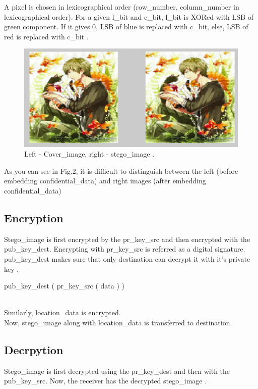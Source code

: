 \documentclass[conference]{IEEEtran}
\begin{document}
A pixel is chosen in lexicographical order (row\_number, column\_number in lexicographical order).
For a given l\_bit and c\_bit, l\_bit is XORed with LSB of green component.
If it gives 0, LSB of blue is replaced with c\_bit, else, LSB of red is replaced with c\_bit \cite{b2}.\\

\begin{figure}[H]
  \includegraphics[width=\linewidth]{cover_image_vs_stego_image.png}
  \caption{Left - Cover\_image, right - stego\_image \cite{b2}.}
\end{figure}

As you can see in Fig.2, it is difficult to distinguish between the left (before embedding confidential\_data) and right images (after embedding confidential\_data)

\subsection{Encryption}
Stego\_image is first encrypted by the pr\_key\_src and then encrypted with the pub\_key\_dest.
Encrypting with pr\_key\_src is referred as a digital signature.
pub\_key\_dest makes sure that only destination can decrypt it with it's private key \cite{b2}.\\

\centerline{ pub\_key\_dest ( pr\_key\_src ( data ) ) }
\leavevmode \\
Similarly, location\_data is encrypted.\\

Now, stego\_image along with location\_data is transferred to destination.

\subsection{Decrpytion}
Stego\_image is first decrypted using the pr\_key\_dest and then with the pub\_key\_src.
Now, the receiver has the decrypted stego\_image .\\
\end{document}
